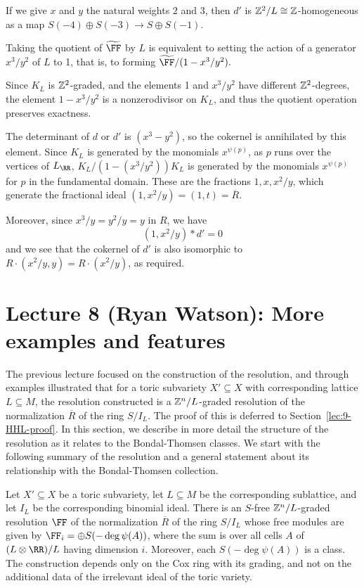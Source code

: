 \documentclass{amsart}
\begin{document}
\begin{example} 
If we give $x$ and $y$ the natural weights $2$ and 3, then $d'$ is $\mathbb Z^2/L \cong \mathbb Z$-homogeneous as a map $S(-4) \oplus S(-3) \to S\oplus S(-1)$.

Taking the quotient of $\tF$ by $L$ is equivalent to setting the action of a generator $x^{3}/y^{2}$ of $L$ to 1, that
is, to forming $\tF/(1-x^{3}/y^{2}).$

Since $K_L$ is $\mathbb Z^{2}$-graded, and the elements 1 and $x^{3}/y^{2}$ have
different $\mathbb Z^{2}$-degrees, the element $1-x^{3}/y^{2}$ is a nonzerodivisor on $K_L$, and thus
the quotient operation preserves exactness.

The determinant of $d$ or $d'$ is 
$(x^3-y^2)$, so the cokernel is annihilated by this element.
Since $K_L$ is generated by
the monomials $x^{\psi(p)}$, as $p$ runs over the vertices of $L_\RR$, $K_L/(1-(x^3/y^2))K_L$
is generated by the monomials $x^{\psi(p)}$ for $p$ in the fundamental domain. 
These are the fractions $1,x,x^2/y$, which generate
the fractional ideal $(1, x^2/y) = (1,t)  = \overline R$.

Moreover, since $x^3/y = y^2/y = y$ in $R$, we have
$$
(1, x^2/y)*d' = 0
$$
and we see that the cokernel of $d'$ is also isomorphic to 
$R\cdot(x^2/y, y) = R\cdot (x^2/y)$, as required.
\end{example}


\section{Lecture 8 (Ryan Watson): More examples and features}\label{lec:8-HHL-examples}

The previous lecture focused on the construction of the resolution, and through examples illustrated that for a toric subvariety $X'\subseteq X$ with corresponding lattice $L\subseteq M$, the resolution constructed is a $\mathbb Z^{n}/L$-graded resolution of the normalization $\overline{R}$ of the ring $S/I_L$. The proof of this is deferred to Section~\ref{lec:9-HHL-proof}. In this section, we describe in more detail the structure of the resolution as it relates to the Bondal-Thomsen classes. We start with the following summary of the resolution and a general statement about its relationship with the Bondal-Thomsen collection.

\begin{cor}
  \label{cor:hhlSummandsBT}
  Let $X'\subseteq X$ be a toric subvariety,  let $L\subseteq M$ be the corresponding sublattice, and let $I_{L}$ be the corresponding binomial ideal. There is an $S$-free $\mathbb Z^{n}/L$-graded resolution $\FF$ of the
  normalization $\overline R$ of the ring $S/I_{L}$ whose free modules are given by $\FF_{i} = \oplus S(-\deg\psi(A))$, where the sum is over all cells $A$ of $(L \otimes \RR)/L$ having dimension $i$. Moreover, each $S(-\deg\psi(A))$ is a \BT class. 
  The construction depends only on the Cox ring with its grading, and not on the additional data of the
  irrelevant ideal of the toric variety.
\end{cor}
\end{document}
